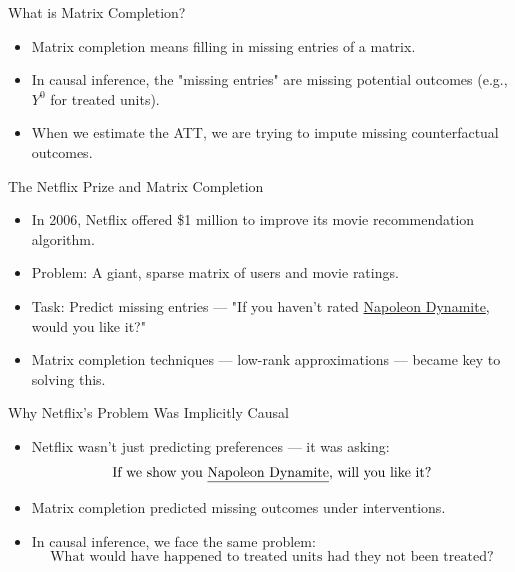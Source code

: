 \documentclass{beamer}
\begin{document}
\begin{frame}{What is Matrix Completion?}
\small
\begin{itemize}
  \item Matrix completion means filling in missing entries of a matrix.
  \item In causal inference, the "missing entries" are missing potential outcomes (e.g., $Y^0$ for treated units).
  \item When we estimate the ATT, we are trying to impute missing counterfactual outcomes.
\end{itemize}
\end{frame}



\begin{frame}{The Netflix Prize and Matrix Completion}
\small
\begin{itemize}
  \item In 2006, Netflix offered \$1 million to improve its movie recommendation algorithm.
  \item Problem: A giant, sparse matrix of users and movie ratings.
  \item Task: Predict missing entries — "If you haven't rated \underline{Napoleon Dynamite}, would you like it?"
  \item Matrix completion techniques — low-rank approximations — became key to solving this.
\end{itemize}
\end{frame}



\begin{frame}{Why Netflix's Problem Was Implicitly Causal}
\small
\begin{itemize}
  \item Netflix wasn't just predicting preferences — it was asking:
  \[
  \text{If we show you \underline{Napoleon Dynamite}, will you like it?}
  \]
  \item Matrix completion predicted missing outcomes under interventions.
  \item In causal inference, we face the same problem:  
  \[
  \text{What would have happened to treated units had they not been treated?}
  \]
\end{itemize}
\end{frame}
\end{document}
